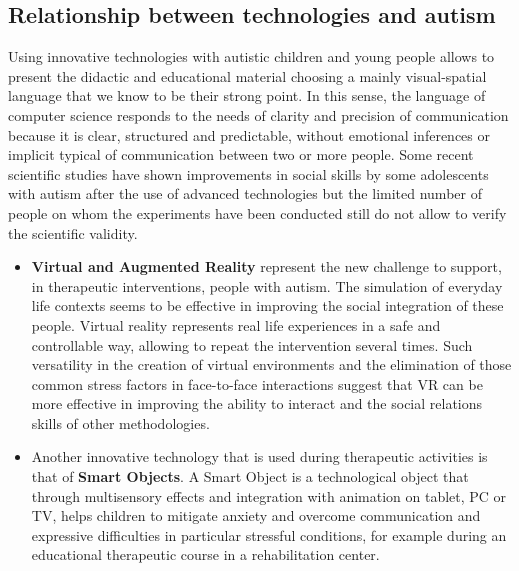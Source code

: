 \documentclass [12pt]{article}
\begin{document}
\subsection{Relationship between technologies and autism}
Using innovative technologies with autistic children and young people allows to present the didactic and educational material choosing a mainly visual-spatial language that we know to be their strong point. In this sense, the language of computer science responds to the needs of clarity and precision of communication because it is clear, structured and predictable, without emotional inferences or implicit typical of communication between two or more people.
Some recent scientific studies have shown improvements in social skills by some adolescents with autism after the use of advanced technologies but the limited number of people on whom the experiments have been conducted still do not allow to verify the scientific validity.
\begin{itemize}[•]
\item  \textbf{Virtual and Augmented Reality} represent the new challenge to support, in therapeutic interventions, people with autism. The simulation of everyday life contexts seems to be effective in improving the social integration of these people. Virtual reality represents real life experiences in a safe and controllable way, allowing to repeat the intervention several times.   Such versatility in the creation of virtual environments and the elimination of those common stress factors in face-to-face interactions suggest that VR can be more effective in improving the ability to interact and the social relations skills of other methodologies. 
\item Another innovative technology that is used during therapeutic activities is that of  \textbf{Smart Objects}. A Smart Object is a technological object that through multisensory effects and integration with animation on tablet, PC or TV, helps children to mitigate anxiety and overcome communication and expressive difficulties in particular stressful conditions, for example during an educational therapeutic course in a rehabilitation center.
\end{itemize}
\end{document}
